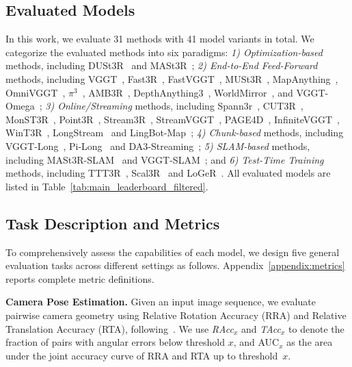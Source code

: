 \documentclass{llmxive}
\begin{document}
\subsection{Evaluated Models} 
In this work, we evaluate 31 methods with 41 model variants in total. 
%
We categorize the evaluated methods into six paradigms: \textit{1) Optimization-based} methods, including DUSt3R~\citep{wang2024dust3r} and MASt3R~\citep{leroy2024mast3r}; \textit{2) End-to-End Feed-Forward} methods, including VGGT~\citep{wang2025vggt}, Fast3R~\citep{yang2025fast3r}, FastVGGT~\citep{shen2025fastvggt}, MUSt3R~\citep{cabon2025must3r}, MapAnything~\citep{keetha2026mapanything}, OmniVGGT~\citep{peng2025omnivggt}, $\pi^3$~\citep{wang2025pi3}, AMB3R~\citep{wang2025amb3r}, DepthAnything3~\citep{lin2025depth}, WorldMirror~\citep{liu2025worldmirror}, and VGGT-Omega~\citep{wang2026vggtomega};  \textit{3) Online/Streaming} methods, including Spann3r~\citep{wang2024spann3r}, CUT3R~\citep{wang2025cut3r}, MonST3R~\citep{zhang2024monst3r}, Point3R~\citep{point3r}, Stream3R~\citep{stream3r2025}, StreamVGGT~\citep{streamVGGT}, PAGE4D~\citep{zhou2025page4d}, InfiniteVGGT~\citep{yuan2026infinitevggt}, WinT3R~\citep{li2025wint3r}, LongStream~\citep{cheng2026longstream} and LingBot-Map~\citep{chen2026lingbotmap}; \textit{4) Chunk-based} methods, including VGGT-Long~\citep{deng2025vggtlong}, Pi-Long~\citep{deng2025vggtlong} and DA3-Streaming~\citep{deng2025vggtlong}; \textit{5) SLAM-based} methods, including MASt3R-SLAM~\citep{murai2024_mast3rslam} and VGGT-SLAM~\citep{maggio2025vggt-slam2}; and \textit{6) Test-Time Training} methods, including TTT3R~\citep{chen2025ttt3r}, Scal3R~\citep{xie2026scal3r} and LoGeR~\citep{zhang2026loger}.
%
All evaluated models are listed in Table~\ref{tab:main_leaderboard_filtered}. 

\subsection{Task Description and Metrics}
To comprehensively assess the capabilities of each model, we design five general evaluation tasks across different settings as follows. 
%
Appendix~\ref{appendix:metrics} reports complete metric definitions.

 
\textbf{Camera Pose Estimation.} Given an input image sequence, we evaluate pairwise camera geometry using Relative Rotation Accuracy (RRA) and Relative Translation Accuracy (RTA), following~\citet{wang2025vggt}.
%
We use \textit{RAcc}$_{x}$ and \textit{TAcc}$_{x}$ to denote the fraction of pairs with angular errors below threshold $x$, and AUC$_{x}$ as the area under the joint accuracy curve of RRA and RTA up to threshold~$x$.
\end{document}
